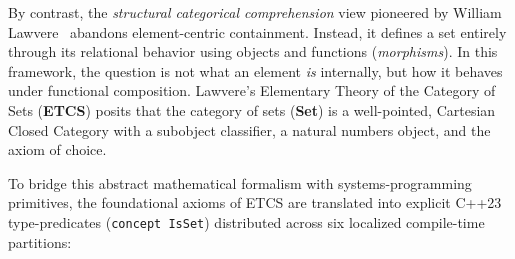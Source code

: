 \documentclass[11pt, a4paper]{article}
\begin{document}
By contrast, the \textit{structural categorical comprehension} view pioneered by William Lawvere~\cite{lawvere1964etcs} abandons element-centric containment. Instead, it defines a set entirely through its relational behavior using objects and functions (\textit{morphisms}). In this framework, the question is not what an element \textit{is} internally, but how it behaves under functional composition. Lawvere’s Elementary Theory of the Category of Sets (\textbf{ETCS}) posits that the category of sets (\textbf{Set}) is a well-pointed, Cartesian Closed Category with a subobject classifier, a natural numbers object, and the axiom of choice.

To bridge this abstract mathematical formalism with systems-programming primitives, the foundational axioms of ETCS are translated into explicit C++23 type-predicates (\texttt{concept IsSet}) distributed across six localized compile-time partitions:
\end{document}

